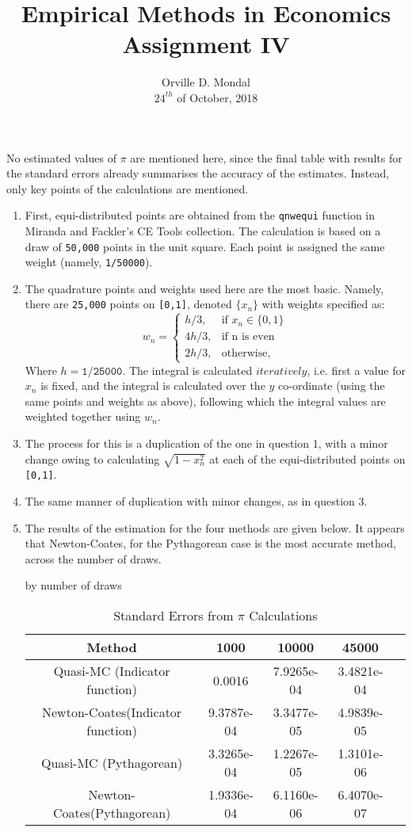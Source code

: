 \documentclass[12pt,a4paper]{article}
\title{Empirical Methods in Economics\\\small{Assignment IV}}
\date{Orville D. Mondal\\ $24^{th}$ of October, 2018\vspace{-3ex}}
\begin{document}
\maketitle
No estimated values of $\pi$ are mentioned here, since the final table with results for the standard errors already summarises the accuracy of the estimates. Instead, only key points of the calculations are mentioned.
\begin{enumerate}[(1)]
\item First, equi-distributed points are obtained from the \texttt{qnwequi} function in Miranda and Fackler's CE Tools collection. The calculation is based on a draw of \texttt{50,000} points in the unit square. Each point is assigned the same weight (namely, \texttt{1/50000}).
\item The quadrature points and weights used here are the most basic. Namely, there are \texttt{25,000} points on \texttt{[0,1]}, denoted $\{x_{n}\}$ with weights specified as:
\[w_{n}=
\begin{cases}
  h/3, & \mbox{if } x_{n}\in\{0,1\} \\
  4h/3, & \mbox{if } \text{n is even} \\
  2h/3, & \mbox{otherwise},
\end{cases}
\]
Where $h=\texttt{1/25000}$. The integral is calculated $iteratively$, i.e. first a value for $x_{n}$ is fixed, and the integral is calculated over the $y$ co-ordinate (using the same points and weights as above), following which the integral values are weighted together using $w_{n}$.
\item The process for this is a duplication of the one in question 1, with a minor change owing to calculating $\sqrt{1-x_n^{2}}$ at each of the equi-distributed points on \texttt{[0,1]}. 
\item The same manner of duplication with minor changes, as in question 3.
\item The results of the estimation for the four methods are given below. It appears that Newton-Coates, for the Pythagorean case is the most accurate method, across the number of draws.
\begin{table}[h]
\caption{Standard Errors from $\pi$ Calculations} by number of draws\vspace{2mm}
\centering
\begin{tabular}{c c c c c}
\hline \hline\vspace{2mm}
Method &1000 &10000 &45000 \\
\hline
Quasi-MC (Indicator function)&0.0016&7.9265e-04&3.4821e-04\\
Newton-Coates(Indicator function)&9.3787e-04&3.3477e-05&4.9839e-05\\
Quasi-MC (Pythagorean)&3.3265e-04&1.2267e-05&1.3101e-06\\
Newton-Coates(Pythagorean)&1.9336e-04&6.1160e-06&6.4070e-07\\
\end{tabular}
\end{table}
\end{enumerate}
\end{document}
